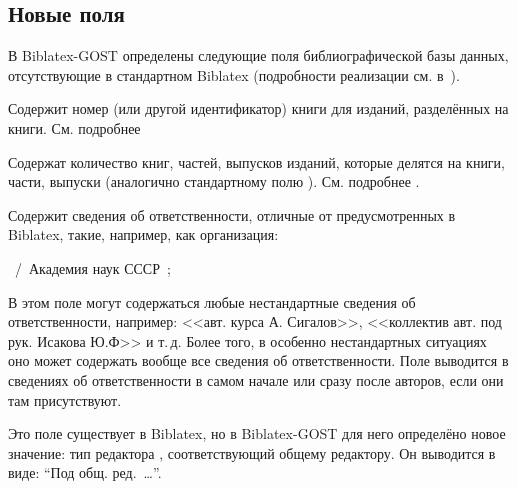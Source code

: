 \documentclass[10pt,a4paper,headings=small,numbers=enddot,english,russian]{ltxdockit}[2011/03/25]
\newcommand*{\biblatex}{Biblatex\xspace}
\newcommand*{\biblatexgost}{\biblatex-GOST\xspace}
\renewcommand*{\apxref}{\refs{прил.}{прил.}}
\newenvironment{bibexample}{\begin{list}{}{}}{\end{list}}
\begin{document}
\subsection{Новые поля}
\label{sec:newfields}
 
В \biblatexgost определены следующие поля библиографической базы данных, 
отсутствующие в стандартном \biblatex 
(подробности реализации см. в~\apxref{bibermap}). 

\begin{fieldlist}


Содержит номер (или другой идентификатор) книги для изданий, разделённых на книги. См. подробнее


Содержат количество книг, частей, выпусков изданий, 
которые делятся на книги, части, выпуски (аналогично стандартному полю ). См.
подробнее .


Содержит сведения об ответственности, отличные от предусмотренных в \biblatex, 
такие, например, как организация:

\begin{bibexample}
\item \textellipsis\ \slash\ Академия наук СССР\ ;\ \textellipsis
\end{bibexample}

В этом поле могут содержаться любые нестандартные сведения об ответственности,
например: <<авт. курса А. Сигалов>>,
<<коллектив авт. под рук. Исакова Ю.Ф>> и т.\,д. 
Более того, в особенно нестандартных ситуациях
оно может содержать вообще все сведения об ответственности. 
Поле  выводится в сведениях об ответственности в самом начале или 
сразу после авторов, если они там присутствуют. 


Это поле существует в \biblatex, но в \biblatexgost для него определёно новое значение: 
тип редактора , соответствующий общему 
редактору. Он выводится в виде: \enquote{Под общ. ред.~\ldots}.



\end{fieldlist}
\end{document}
